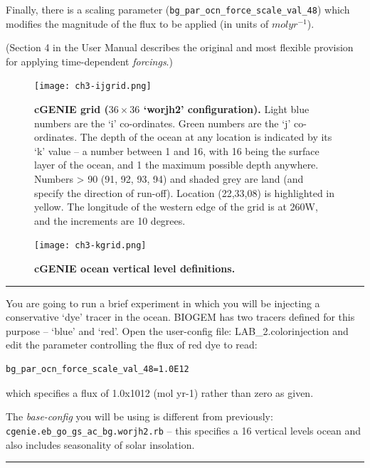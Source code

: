 \documentclass[11pt,fleqn]{book} %
\begin{document}
Finally, there is a scaling parameter (\texttt{bg\_par\_ocn\_force\_scale\_val\_48}) which modifies the magnitude of the flux to be applied (in units of \(mol yr^{-1}\)).

(Section 4 in the User Manual describes the original and most flexible provision for applying time-dependent \textit{forcings}.)


\begin{figure}
\texttt{[image: ch3-ijgrid.png]}\centering
\vspace{-0mm}
\caption{
\textbf{cGENIE grid (\(36\times36\) ‘worjh2’ configuration).} 
Light blue numbers are the ‘i’ co-ordinates. Green numbers are the ‘j’ co-ordinates.
The depth of the ocean at any location is indicated by its ‘k’ value – a number between 1 and 16, with 16 being the surface layer of the ocean, and 1 the maximum possible depth anywhere.
Numbers > 90 (91, 92, 93, 94) and shaded grey are land (and specify the direction of run-off).
Location (22,33,08) is highlighted in yellow.
The longitude of the western edge of the grid is at 260W, and the increments are 10 degrees. 
}
\label{fig:ch3-ijgrid}
\end{figure}

\begin{figure}
\texttt{[image: ch3-kgrid.png]}\centering
\vspace{-0mm}
\caption{\textbf{cGENIE ocean vertical level definitions.}}
\label{fig:ch3-kgrid}
\end{figure}

\hfill \break
\noindent\rule{4cm}{0.1mm}
\hfill \break

You are going to run a brief experiment in which you will be injecting a conservative ‘dye’ tracer in the ocean. BIOGEM has two tracers defined for this purpose – ‘blue’ and ‘red’. Open the user-config file: LAB\_2.colorinjection and edit the parameter controlling the flux of red dye to read:

\begin{verbatim}
bg_par_ocn_force_scale_val_48=1.0E12
\end{verbatim}

\noindent which specifies a flux of 1.0x1012 (mol yr-1) rather than zero as given.

The \textit{base-config} you will be using is different from previously: \texttt{cgenie.eb\_go\_gs\_ac\_bg.worjh2.rb} – this specifies a 16 vertical levels ocean and also includes seasonality of solar insolation.

\hfill \break
\noindent\rule{4cm}{0.1mm}
\hfill \break
\end{document}
